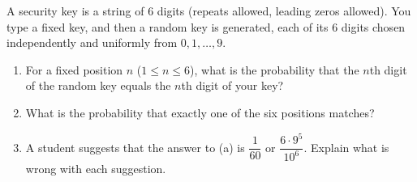 A security key is a string of $6$ digits (repeats allowed, leading zeros allowed). You type a fixed key, and then a random key is generated, each of its $6$ digits chosen independently and uniformly from $0,1,\dots,9$.
\begin{enumerate}
\item[(a)] For a fixed position $n$ ($1\le n\le6$), what is the probability that the $n$th digit of the random key equals the $n$th digit of your key?
\item[(b)] What is the probability that exactly one of the six positions matches?
\item[(c)] A student suggests that the answer to (a) is $\dfrac{1}{60}$ or $\dfrac{6\cdot9^5}{10^6}$. Explain what is wrong with each suggestion.
\end{enumerate}

